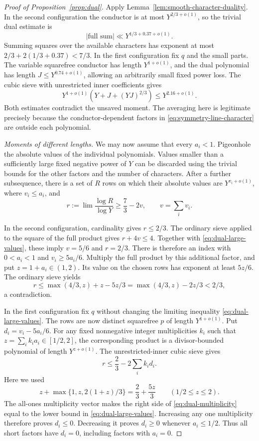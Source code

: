 \begin{proof}[Proof of Proposition~\ref{prop:dual}]
Apply Lemma~\ref{lem:smooth-character-duality}.  In the second
configuration the conductor is at most $Y^{2/3+o(1)}$, so the trivial
dual estimate is
\[
 |\text{full sum}|\ll Y^{1/3+0.37+o(1)}.
\]
Summing squares over the available characters has exponent at most
$2/3+2(1/3+0.37)<7/3$.  In the first configuration fix $q$ and the
small parts.  The variable squarefree conductor has length
$Y^{1+o(1)}$, and the dual polynomial has length
$J\le Y^{0.74+o(1)}$, allowing an arbitrarily small fixed power
loss.  The cubic sieve with unrestricted inner coefficients gives
\[
 Y^{1+o(1)}\left(Y+J+(YJ)^{2/3}\right)
 \le Y^{2.16+o(1)}.
\]
Both estimates contradict the unsaved moment.  The averaging here is
legitimate precisely because the conductor-dependent factors in
\eqref{eq:symmetry-line-character} are outside each polynomial.

\smallskip
\noindent\emph{Moments of different lengths.}
We may now assume that every $a_i<1$.  Pigeonhole the absolute values
of the individual polynomials.  Values smaller than a sufficiently
large fixed negative power of $Y$ can be discarded using the trivial
bounds for the other factors and the number of characters.  After a
further subsequence, there is a set of $R$ rows on which their
absolute values are $Y^{v_i+o(1)}$, where $v_i\le a_i$, and
\begin{equation}
 r:=\lim\frac{\log R}{\log Y}\ge\frac73-2v,
 \qquad v=\sum_i v_i.
 \label{eq:dual-large-values}
\end{equation}

In the second configuration, cardinality gives $r\le2/3$.
The ordinary sieve applied to the square of the full product gives
$r+4v\le4$.  Together with \eqref{eq:dual-large-values}, these imply
$v=5/6$ and $r=2/3$.  There is therefore an index with
$0<a_i<1$ and $v_i\ge5a_i/6$.  Multiply the full product by this
additional factor, and put $z=1+a_i\in(1,2)$.  Its value on the
chosen rows has exponent at least $5z/6$.  The ordinary sieve yields
\[
 r\le \max(4/3,z)+z-5z/3
      =\max(4/3,z)-2z/3<2/3,
\]
a contradiction.

In the first configuration fix $q$ without changing the limiting
inequality \eqref{eq:dual-large-values}.  The rows are now distinct
squarefree $p$ of length $Y^{1+o(1)}$.  Put
$d_i=v_i-5a_i/6$.  For any fixed nonnegative integer multiplicities
$k_i$ such that $z=\sum_i k_i a_i\in[1/2,2]$, the corresponding
product is a divisor-bounded polynomial of length $Y^{z+o(1)}$.
The unrestricted-inner cubic sieve gives
\begin{equation}
 r\le \frac23-2\sum_i k_i d_i.
 \label{eq:dual-multiplicity}
\end{equation}
Here we used
\[
 z+\max\{1,z,2(1+z)/3\}=\frac23+\frac{5z}{3}
 \qquad (1/2\le z\le2).
\]
The all-ones multiplicity vector makes the right side of
\eqref{eq:dual-multiplicity} equal to the lower bound in
\eqref{eq:dual-large-values}.  Increasing any one multiplicity
therefore proves $d_i\le0$.  Decreasing it proves $d_i\ge0$ whenever
$a_i\le1/2$.  Thus all short factors have $d_i=0$, including factors
with $a_i=0$.


\end{proof}
